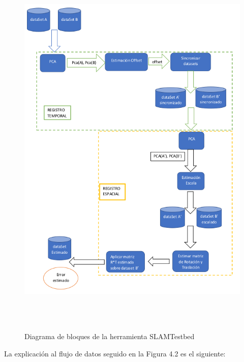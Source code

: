 \begin{figure}
\begin{center}
\label{fig:Open File}\includegraphics[height=18.0cm,width=12.0cm]{img/cap5/EsquemaTFM_CajaBlanca_Transformaciones4.png}
\hspace{0.5cm}
\end{center}
\caption{ Diagrama de bloques de la herramienta SLAMTestbed }
\end{figure}

La explicación al flujo de datos seguido en la Figura 4.2 es el siguiente:


